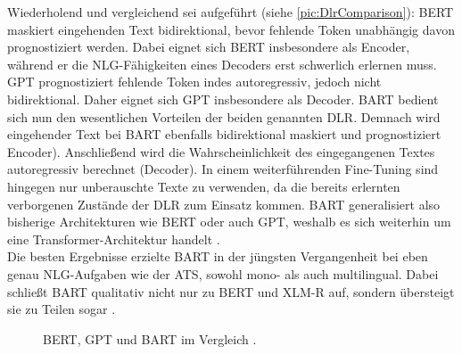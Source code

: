\noindent
Wiederholend und vergleichend sei aufgeführt (siehe \autoref{pic:DlrComparison}): \ac{BERT} maskiert eingehenden Text bidirektional, bevor fehlende Token unabhängig davon prognostiziert werden. Dabei eignet sich \ac{BERT} insbesondere als Encoder, während er die \ac{NLG}-Fähigkeiten eines Decoders erst schwerlich erlernen muss. \ac{GPT} prognostiziert fehlende Token indes autoregressiv, jedoch nicht bidirektional. Daher eignet sich \ac{GPT} insbesondere als Decoder. \ac{BART} bedient sich nun den wesentlichen Vorteilen der beiden genannten \ac{DLR}. Demnach wird eingehender Text bei \ac{BART} ebenfalls bidirektional maskiert und prognostiziert Encoder). Anschließend wird die Wahrscheinlichkeit des eingegangenen Textes autoregressiv berechnet (Decoder). In einem weiterführenden Fine-Tuning sind hingegen nur unberauschte Texte zu verwenden, da die bereits erlernten verborgenen Zustände der \ac{DLR} zum Einsatz kommen. \ac{BART} generalisiert also bisherige Architekturen wie \ac{BERT} oder auch \ac{GPT}, weshalb es sich weiterhin um eine Transformer-Architektur handelt \cite[S.~2-3]{LEW19}.\\

\noindent
Die besten Ergebnisse erzielte \ac{BART} in der jüngsten Vergangenheit bei eben genau \ac{NLG}-Aufgaben wie der \ac{ATS}, sowohl mono- als auch multilingual. Dabei schließt \ac{BART} qualitativ nicht nur zu \ac{BERT} und \ac{XLM-R} auf, sondern übersteigt sie zu Teilen sogar \cite{LEW19}.
\\

\begin{figure}[h!]
  \centering
  \caption{BERT, GPT und BART im Vergleich \cite[S.~2]{LEW19}.}
  \label{pic:DlrComparison}
\end{figure}
\newpage


